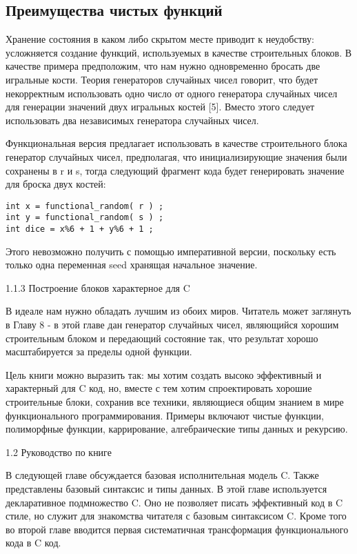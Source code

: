 \subsection{Преимущества чистых функций}

Хранение состояния в каком либо скрытом месте приводит к неудобству: усложняется создание функций, используемых в качестве строительных блоков. В качестве примера предположим, что нам нужно одновременно бросать две игральные кости. Теория генераторов случайных чисел говорит, что будет некорректным использовать одно число от одного генератора случайных чисел для генерации значений двух игральных костей [5]. Вместо этого следует использовать два независимых генератора случайных чисел.

Функциональная версия предлагает использовать в качестве строительного блока генератор случайных чисел, предполагая, что инициализирующие значения были сохранены в r и s, тогда следующий фрагмент кода будет генерировать значение для броска двух костей:

\begin{lstlisting}
int x = functional_random( r ) ;
int y = functional_random( s ) ;
int dice = x%6 + 1 + y%6 + 1 ;
\end{lstlisting}

Этого невозможно получить с помощью императивной версии, поскольку есть только одна переменная seed хранящая начальное значение.

1.1.3 Построение блоков характерное для C

В идеале нам нужно обладать лучшим из обоих миров. Читатель может заглянуть в Главу 8 - в этой главе дан генератор случайных чисел, являющийся хорошим строительным блоком и передающий состояние так, что результат хорошо масштабируется за пределы одной функции.

Цель книги можно выразить так: мы хотим создать высоко эффективный и характерный для C код, но, вместе с тем хотим спроектировать хорошие строительные блоки, сохранив все техники, являющиеся общим знанием в мире функционального программирования. Примеры включают чистые функции, полиморфные функции, каррирование, алгебраические типы данных и рекурсию.

1.2 Руководство по книге

В следующей главе обсуждается базовая исполнительная модель C. Также представлены базовый синтаксис и типы данных. В этой главе используется декларативное подмножество C. Оно не позволяет писать эффективный код в C стиле, но служит для знакомства читателя с базовым синтаксисом C. Кроме того во второй главе вводится первая систематичная трансформация функционального кода в C код.

